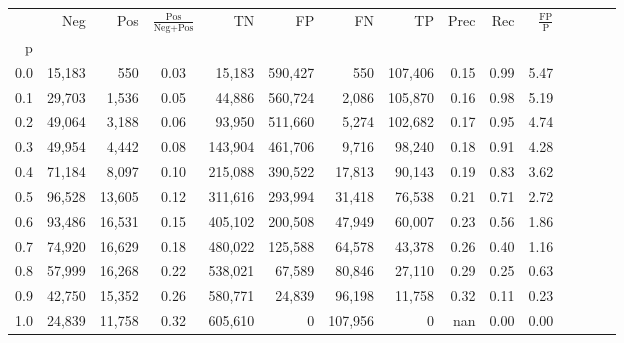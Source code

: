 \begin{tabular}{rrrcrrrrrrrrrrr}
\toprule
{} &     Neg &     Pos & $\frac{\text{Pos}}{\text{Neg}+\text{Pos}}$ &       TN &       FP &       FN &       TP &  Prec &   Rec & $\frac{\text{FP}}{\text{P}}$ \\
p   &         &         &                                            &          &          &          &          &       &       &                              \\
\midrule
0.0 &  15,183 &     550 &                                       0.03 &   15,183 &  590,427 &      550 &  107,406 &  0.15 &  0.99 &                         5.47 \\
0.1 &  29,703 &   1,536 &                                       0.05 &   44,886 &  560,724 &    2,086 &  105,870 &  0.16 &  0.98 &                         5.19 \\
0.2 &  49,064 &   3,188 &                                       0.06 &   93,950 &  511,660 &    5,274 &  102,682 &  0.17 &  0.95 &                         4.74 \\
0.3 &  49,954 &   4,442 &                                       0.08 &  143,904 &  461,706 &    9,716 &   98,240 &  0.18 &  0.91 &                         4.28 \\
0.4 &  71,184 &   8,097 &                                       0.10 &  215,088 &  390,522 &   17,813 &   90,143 &  0.19 &  0.83 &                         3.62 \\
0.5 &  96,528 &  13,605 &                                       0.12 &  311,616 &  293,994 &   31,418 &   76,538 &  0.21 &  0.71 &                         2.72 \\
0.6 &  93,486 &  16,531 &                                       0.15 &  405,102 &  200,508 &   47,949 &   60,007 &  0.23 &  0.56 &                         1.86 \\
0.7 &  74,920 &  16,629 &                                       0.18 &  480,022 &  125,588 &   64,578 &   43,378 &  0.26 &  0.40 &                         1.16 \\
0.8 &  57,999 &  16,268 &                                       0.22 &  538,021 &   67,589 &   80,846 &   27,110 &  0.29 &  0.25 &                         0.63 \\
0.9 &  42,750 &  15,352 &                                       0.26 &  580,771 &   24,839 &   96,198 &   11,758 &  0.32 &  0.11 &                         0.23 \\
1.0 &  24,839 &  11,758 &                                       0.32 &  605,610 &        0 &  107,956 &        0 &   nan &  0.00 &                         0.00 \\
\bottomrule
\end{tabular}
